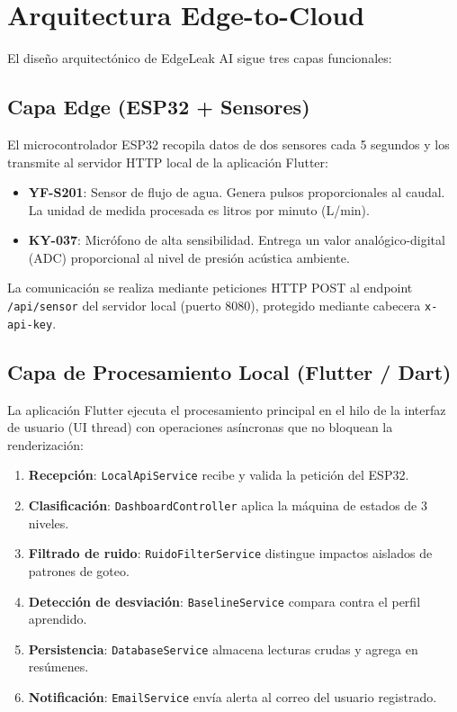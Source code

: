 \documentclass[12pt,a4paper]{article}
\begin{document}
\section{Arquitectura Edge-to-Cloud}

El diseño arquitectónico de EdgeLeak AI sigue tres capas funcionales:

\subsection{Capa Edge (ESP32 + Sensores)}

El microcontrolador ESP32 recopila datos de dos sensores cada 5 segundos y los transmite al servidor HTTP local de la aplicación Flutter:

\begin{itemize}[noitemsep]
    \item \textbf{YF-S201}: Sensor de flujo de agua. Genera pulsos proporcionales al caudal. La unidad de medida procesada es litros por minuto (L/min).
    \item \textbf{KY-037}: Micrófono de alta sensibilidad. Entrega un valor analógico-digital (ADC) proporcional al nivel de presión acústica ambiente.
\end{itemize}

La comunicación se realiza mediante peticiones HTTP POST al endpoint \texttt{/api/sensor} del servidor local (puerto 8080), protegido mediante cabecera \texttt{x-api-key}.

\subsection{Capa de Procesamiento Local (Flutter / Dart)}

La aplicación Flutter ejecuta el procesamiento principal en el hilo de la interfaz de usuario (UI thread) con operaciones asíncronas que no bloquean la renderización:

\begin{enumerate}[noitemsep]
    \item \textbf{Recepción}: \texttt{LocalApiService} recibe y valida la petición del ESP32.
    \item \textbf{Clasificación}: \texttt{DashboardController} aplica la máquina de estados de 3 niveles.
    \item \textbf{Filtrado de ruido}: \texttt{RuidoFilterService} distingue impactos aislados de patrones de goteo.
    \item \textbf{Detección de desviación}: \texttt{BaselineService} compara contra el perfil aprendido.
    \item \textbf{Persistencia}: \texttt{DatabaseService} almacena lecturas crudas y agrega en resúmenes.
    \item \textbf{Notificación}: \texttt{EmailService} envía alerta al correo del usuario registrado.
\end{enumerate}
\end{document}

